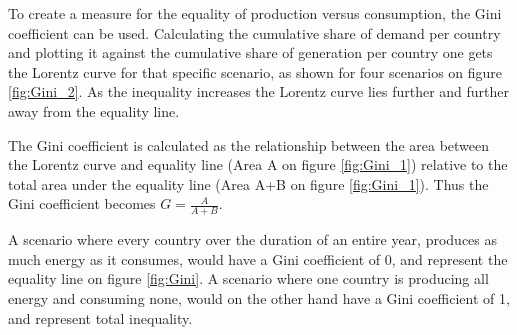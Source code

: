 To create a measure for the equality of production versus consumption, the Gini coefficient can be used. Calculating the cumulative share of demand per country and plotting it against the cumulative share of generation per country one gets the Lorentz curve for that specific scenario, as shown for four scenarios on figure \ref{fig:Gini_2}. As the inequality increases the Lorentz curve lies further and further away from the equality line. 

The Gini coefficient is calculated as the relationship between the area between the Lorentz curve and equality line (Area A on figure \ref{fig:Gini_1}) relative to the total area under the equality line  (Area A+B on figure \ref{fig:Gini_1}). Thus the Gini coefficient becomes $G = \frac{A}{A+B}$.

A scenario where every country over the duration of an entire year, produces as much energy as it consumes, would have a Gini coefficient of 0, and represent the equality line on figure \ref{fig:Gini}. A scenario where one country is producing all energy and consuming none, would on the other hand have a Gini coefficient of 1, and represent total inequality. 



